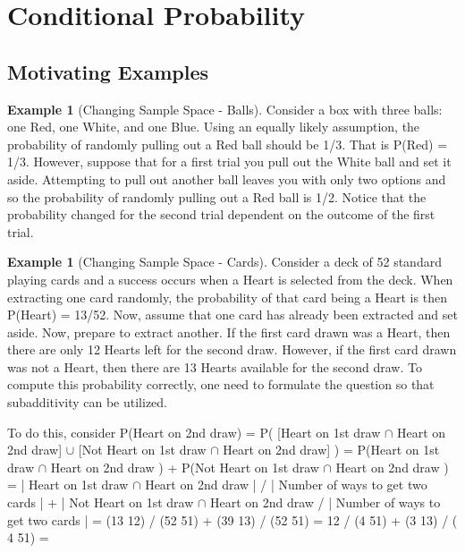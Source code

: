 \documentclass[10pt,]{book}
\theoremstyle{plain}
\theoremstyle{definition}
\theoremstyle{definition}
\newtheorem{example}[theorem]{Example}
\numberwithin{equation}{section}
\begin{document}
\section[Conditional Probability]{Conditional Probability}\label{section-14}
\typeout{************************************************}
\typeout{************************************************}
\subsection[Motivating Examples]{Motivating Examples}\label{subsection-11}
\begin{example}[Changing Sample Space - Balls]\label{example-10}
Consider a box with three balls: one Red, one White, and one Blue.  Using an equally likely assumption,
	the probability of randomly pulling out a Red ball should be 1/3.  That is P(Red) = 1/3.  However, suppose
	that for a first trial you pull out the White ball and set it aside. Attempting to pull out another ball leaves
	you with only two options and so the probability of randomly pulling out a Red ball is 1/2. Notice that the 
	probability changed for the second trial dependent on the outcome of the first trial.%
\end{example}
\begin{example}[Changing Sample Space - Cards]\label{example-11}
Consider a deck of 52 standard playing cards and a success occurs when a Heart is selected from the deck. 
	When extracting one card randomly, the probability
	of that card being a Heart is then P(Heart) = 13/52. Now, assume that one card has already been extracted and set
	aside.  Now, 
	prepare to extract another. If the first card drawn was a Heart, then there are only 12 Hearts left for the 
	second draw. However, if the first card drawn was not a Heart, then there are 13 Hearts available for the second
	draw. To compute this probability correctly, one need to formulate the question so that subadditivity can 
	be utilized.%
\par

	To do this, consider 
	P(Heart on 2nd draw) 
	= P( [Heart on 1st draw \(\cap\) Heart on 2nd draw] \(\cup\) [Not Heart on 1st draw \(\cap\) Heart on 2nd draw] )
	= P(Heart on 1st draw \(\cap\) Heart on 2nd draw ) + P(Not Heart on 1st draw \(\cap\) Heart on 2nd draw )
	= | Heart on 1st draw \(\cap\) Heart on 2nd draw | / | Number of ways to get two cards |
	+ | Not Heart on 1st draw \(\cap\) Heart on 2nd draw / | Number of ways to get two cards |
	= (13 12) / (52 51) + (39 13) / (52 51) = 12 / (4 51) + (3 13) / ( 4 51) =  

\end{example}
\typeout{************************************************}
\typeout{************************************************}
\end{document}
